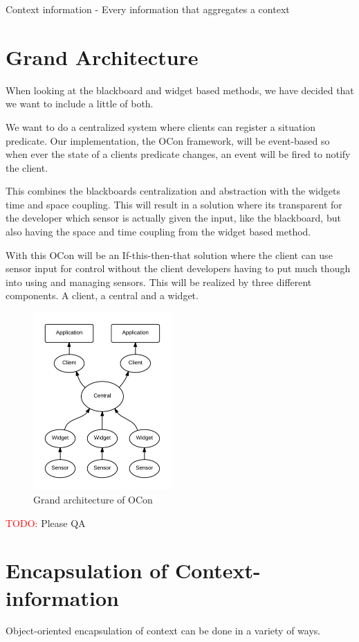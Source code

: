 \documentclass[]{report}
\newcommand\todo[1]{\textcolor{red}{TODO: }#1\PackageWarning{TODO:}{TODO tag!!}}
\begin{document}
	Context information - Every information that aggregates a context

\section{Grand Architecture}
When looking at the blackboard and widget based methods, we have decided that we want to include a little of both.

We want to do a centralized system where clients can register a situation predicate. Our implementation, the OCon framework, will be event-based so when ever the state of a clients predicate changes, an event will be fired to notify the client. 

This combines the blackboards centralization and abstraction with the widgets time and space coupling. This will result in a solution where its transparent for the developer which sensor is actually given the input, like the blackboard, but also having the space and time coupling from the widget based method.

With this OCon will be an If-this-then-that solution where the client can use sensor input for control without the client developers having to put much though into using and managing sensors. This will be realized by three different components. A client, a central and a widget. 

\begin{figure}
\centering
\includegraphics[width=200px]{grandarchitecture.png}
\caption{Grand architecture of OCon}
\label{fig:composite}
\end{figure}

\todo Please QA

\section{Encapsulation of Context-information}
Object-oriented encapsulation of context can be done in a variety of ways.
\end{document}
